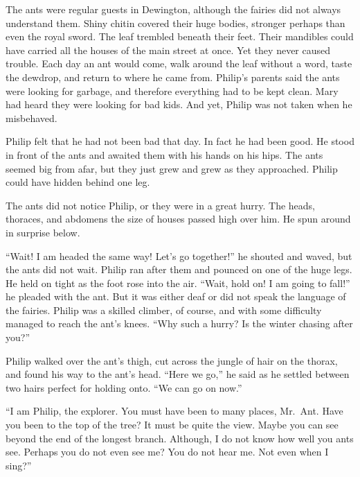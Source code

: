 \documentclass[10pt]{memoir}
\begin{document}
The ants were regular guests in Dewington, although the fairies did not always
understand them. Shiny chitin covered their huge bodies, stronger perhaps than
even the royal sword. The leaf trembled beneath their feet. Their mandibles
could have carried all the houses of the main street at once. Yet they never
caused trouble. Each day an ant would come, walk around the leaf without a
word, taste the dewdrop, and return to where he came from. Philip's parents
said the ants were looking for garbage, and therefore everything had to be kept
clean. Mary had heard they were looking for bad kids. And yet, Philip was not
taken when he misbehaved.

Philip felt that he had not been bad that day. In fact he had been good. He
stood in front of the ants and awaited them with his hands on his hips. The
ants seemed big from afar, but they just grew and grew as they approached.
Philip could have hidden behind one leg.

The ants did not notice Philip, or they were in a great hurry. The heads,
thoraces, and abdomens the size of houses passed high over him. He spun around
in surprise below.

``Wait! I am headed the same way! Let's go together!'' he shouted and waved,
but the ants did not wait. Philip ran after them and pounced on one of the huge
legs. He held on tight as the foot rose into the air. ``Wait, hold on! I am
going to fall!'' he pleaded with the ant. But it was either deaf or did not
speak the language of the fairies. Philip was a skilled climber, of course, and
with some difficulty managed to reach the ant's knees. ``Why such a hurry? Is
the winter chasing after you?''

Philip walked over the ant's thigh, cut across the jungle of hair on the
thorax, and found his way to the ant's head. ``Here we go,'' he said as he
settled between two hairs perfect for holding onto. ``We can go on now.''

``I am Philip, the explorer. You must have been to many places, Mr.~Ant. Have
you been to the top of the tree? It must be quite the view. Maybe you can see
beyond the end of the longest branch. Although, I do not know how well you ants
see. Perhaps you do not even see me? You do not hear me. Not even when I
sing?''
\end{document}
